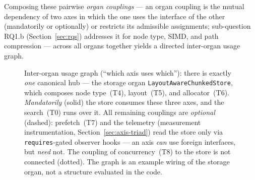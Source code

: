 \begin{nurlang}
Composing these pairwise \emph{organ couplings} --- an organ coupling is the mutual
dependency of two axes in which the one uses the interface of the other (mandatorily or
optionally) or restricts its admissible assignments; sub-question RQ1.b (Section~\ref{sec:rqs})
addresses it for node type, SIMD, and path compression --- across all organs together yields a
directed inter-organ usage graph.
\begin{figure}[htbp]\centering
\caption{Inter-organ usage graph (\enquote{which axis uses which}): there is exactly \emph{one}
canonical hub --- the storage organ \texttt{LayoutAwareChunkedStore}, which composes node type~(T4), layout~(T5),
and allocator~(T6)\@. \emph{Mandatorily} (solid) the store consumes these three axes,
and the search~(T0) runs over it. All remaining couplings are \emph{optional} (dashed): prefetch~(T7)
and the telemetry (measurement instrumentation, Section~\ref{sec:axis-triad}) read the store only via \texttt{requires}-gated observer hooks --- an axis
\emph{can} use foreign interfaces, but \emph{need} not. The coupling of concurrency~(T8) to the
store is not connected (dotted). The graph is an example wiring of the storage organ,
not a structure evaluated in the code.}\label{fig:usage}
\end{figure}

\end{nurlang}
